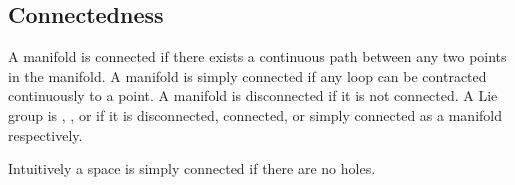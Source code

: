 \documentclass[fleqn]{NotesClass}
\begin{document}
    \subsection{Connectedness}
    \begin{dfn}{}{}
        A manifold is connected if there exists a continuous path between any two points in the manifold.
        A manifold is simply connected if any loop can be contracted continuously to a point.
        A manifold is disconnected if it is not connected.
        A Lie group is , , or  if it is disconnected, connected, or simply connected as a manifold respectively.
    \end{dfn}
    
    Intuitively a space is simply connected if there are no holes.
    
\end{document}
